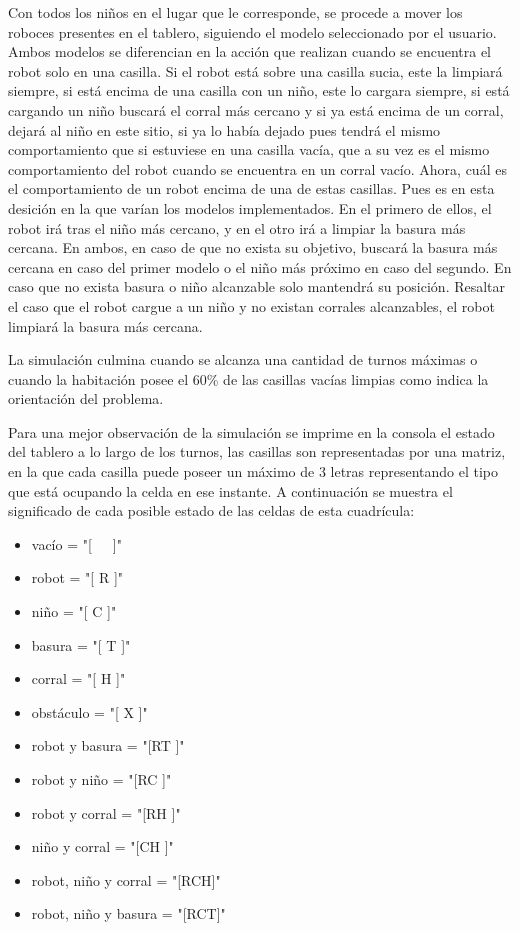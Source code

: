 \documentclass[titlepage,11pt]{scrartcl}
\begin{document}
Con todos los niños en el lugar que le corresponde, se procede a mover los roboces presentes en el tablero, siguiendo el modelo seleccionado por el usuario. Ambos modelos se diferencian en la acción que realizan cuando se encuentra el robot solo en una casilla. Si el robot está sobre una casilla sucia, este la limpiará siempre, si está encima de una casilla con un niño, este lo cargara siempre, si está cargando un niño buscará el corral más cercano y si ya está encima de un corral, dejará al niño en este sitio, si ya lo había dejado pues tendrá el mismo comportamiento que si estuviese en una casilla vacía, que a su vez es el mismo comportamiento del robot cuando se encuentra en un corral vacío. Ahora, cuál es el comportamiento de un robot encima de una de estas casillas. Pues es en esta desición en la que varían los modelos implementados. En el primero de ellos, el robot irá tras el niño más cercano, y en el otro irá a limpiar la basura más cercana. En ambos, en caso de que no exista su objetivo, buscará la basura más cercana en caso del primer modelo o el niño más próximo en caso del segundo. En caso que no exista basura o niño alcanzable solo mantendrá su posición. Resaltar el caso que el robot cargue a un niño y no existan corrales alcanzables, el robot limpiará la basura más cercana.

La simulación culmina cuando se alcanza una cantidad de turnos máximas o cuando la habitación posee el 60\% de las casillas vacías limpias como indica la orientación del problema.

Para una mejor observación de la simulación se imprime en la consola el estado del tablero a lo largo de los turnos, las casillas son representadas por una matriz, en la que cada casilla puede poseer un máximo de 3 letras representando el tipo que está ocupando la celda en ese instante. A continuación se muestra el significado de cada posible estado de las celdas de esta cuadrícula:

\begin{itemize}
    \item vacío = "[\ \ \ ]"
    \item robot = "[ R ]"
    \item niño = "[ C ]"
    \item basura = "[ T ]"
    \item corral = "[ H ]"
    \item obstáculo = "[ X ]"
    \item robot y basura = "[RT ]"
    \item robot y niño = "[RC ]"
    \item robot y corral = "[RH ]"
    \item niño y corral = "[CH ]"
    \item robot, niño y corral = "[RCH]"
    \item robot, niño y basura = "[RCT]"
\end{itemize}
\end{document}
